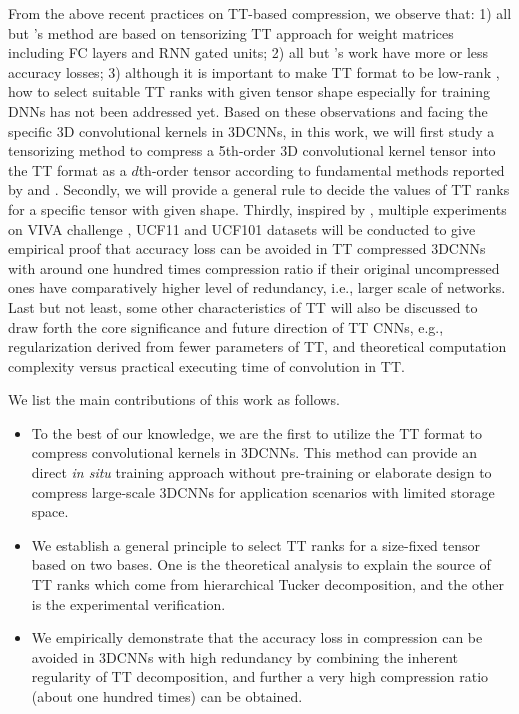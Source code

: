 \documentclass[a4paper,fleqn]{cas-dc}
\begin{document}
From the above recent practices on TT-based compression, we observe that: 1) all but \citet{Garipov_2016_TTCNN}'s method are based on tensorizing TT approach for weight matrices including FC layers and RNN gated units; 2) all but \citet{Yang_2017_TTRNN}'s work have more or less accuracy losses; 3) although it is important to make TT format to be low-rank \citep{Lee_2014_TTRanks,Bengua_2017_TTRanks}, how to select suitable TT ranks with given tensor shape especially for training DNNs has not been addressed yet. Based on these observations and facing the specific 3D convolutional kernels in 3DCNNs, in this work, we will first study a tensorizing method to compress a 5th-order 3D convolutional kernel tensor into the TT format as a \(d\)th-order tensor according to fundamental methods reported by \citet{Novikov_2015_TT} and \citet{Garipov_2016_TTCNN}. Secondly, we will provide a general rule to decide the values of TT ranks for a specific tensor with given shape. Thirdly, inspired by \citet{Yang_2017_TTRNN}, multiple experiments on VIVA challenge \citep{Ohn-Bar_2014_VIVA}, UCF11 \citep{Liu_2011_UCF11} and UCF101 \citep{Soomro_2012_UCF101} datasets will be conducted to give empirical proof that accuracy loss can be avoided in TT compressed 3DCNNs with around one hundred times compression ratio if their original uncompressed ones have comparatively higher level of redundancy, i.e., larger scale of networks. Last but not least, some other characteristics of TT will also be discussed to draw forth the core significance and future direction of TT CNNs, e.g., regularization derived from fewer parameters of TT, and theoretical computation complexity versus practical executing time of convolution in TT.

We list the main contributions of this work as follows.
\begin{itemize}
\item To the best of our knowledge, we are the first to utilize the TT format to compress convolutional kernels in 3DCNNs. This method can provide an direct \emph{in situ} training approach without pre-training or elaborate design to compress large-scale 3DCNNs for application scenarios with limited storage space.

\item We establish a general principle to select TT ranks for a size-fixed tensor based on two bases. One is the theoretical analysis to explain the source of TT ranks which come from hierarchical Tucker decomposition, and the other is the experimental verification.

\item We empirically demonstrate that the accuracy loss in compression can be avoided in 3DCNNs with high redundancy by combining the inherent regularity of TT decomposition, and further a very high compression ratio (about one hundred times) can be obtained.
\end{itemize}
\end{document}

